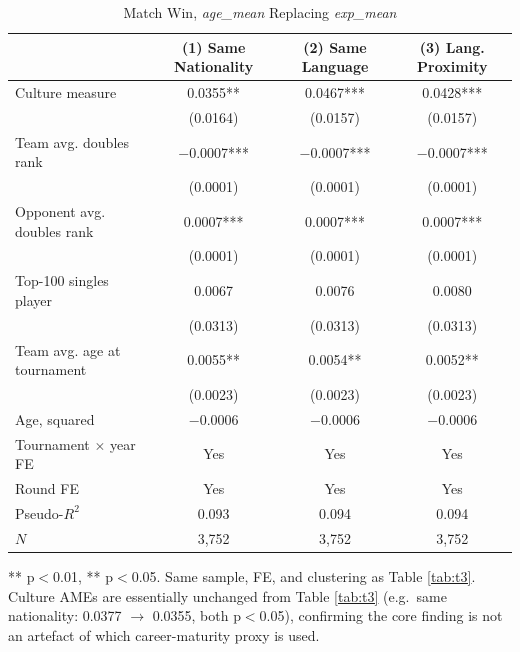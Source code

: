 \documentclass[10pt]{article}
\begin{document}
\begin{table}[htbp]
\color{blue}
\centering
\caption{Match Win, \textit{age\_mean} Replacing \textit{exp\_mean} \label{tab:ta1}}
\begin{threeparttable}
\begin{tabular}{lccc}
\toprule
 & (1) Same Nationality & (2) Same Language & (3) Lang. Proximity \\
\midrule
Culture measure & 0.0355** & 0.0467*** & 0.0428*** \\
 & (0.0164) & (0.0157) & (0.0157) \\
Team avg. doubles rank & $-$0.0007*** & $-$0.0007*** & $-$0.0007*** \\
 & (0.0001) & (0.0001) & (0.0001) \\
Opponent avg. doubles rank & 0.0007*** & 0.0007*** & 0.0007*** \\
 & (0.0001) & (0.0001) & (0.0001) \\
Top-100 singles player & 0.0067 & 0.0076 & 0.0080 \\
 & (0.0313) & (0.0313) & (0.0313) \\
Team avg. age at tournament & 0.0055** & 0.0054** & 0.0052** \\
 & (0.0023) & (0.0023) & (0.0023) \\
Age, squared & $-$0.0006 & $-$0.0006 & $-$0.0006 \\
\midrule
Tournament $\times$ year FE & Yes & Yes & Yes \\
Round FE & Yes & Yes & Yes \\
Pseudo-$R^2$ & 0.093 & 0.094 & 0.094 \\
$N$ & 3,752 & 3,752 & 3,752 \\
\bottomrule
\end{tabular}
\begin{tablenotes}
\small
\item *** p$<$0.01, ** p$<$0.05. Same sample, FE, and clustering as Table \ref{tab:t3}. Culture AMEs are essentially unchanged from Table \ref{tab:t3} (e.g.\ same nationality: 0.0377 $\to$ 0.0355, both p$<$0.05), confirming the core finding is not an artefact of which career-maturity proxy is used.
\end{tablenotes}
\end{threeparttable}
\end{table}
\FloatBarrier
\end{document}
